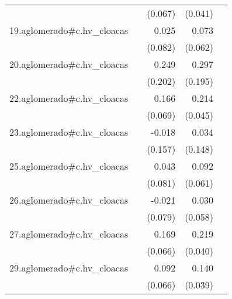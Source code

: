 {\begin{longtable}{l*{4}{D{.}{.}{-1}}}
            &                     &     (0.067)         &     (0.041)         &                     \\
\addlinespace
19.aglomerado#c.hv\_cloacas&                     &       0.025         &       0.073         &                     \\
            &                     &     (0.082)         &     (0.062)         &                     \\
\addlinespace
20.aglomerado#c.hv\_cloacas&                     &       0.249         &       0.297         &                     \\
            &                     &     (0.202)         &     (0.195)         &                     \\
\addlinespace
22.aglomerado#c.hv\_cloacas&                     &       0.166\sym{*}  &       0.214\sym{***}&                     \\
            &                     &     (0.069)         &     (0.045)         &                     \\
\addlinespace
23.aglomerado#c.hv\_cloacas&                     &      -0.018         &       0.034         &                     \\
            &                     &     (0.157)         &     (0.148)         &                     \\
\addlinespace
25.aglomerado#c.hv\_cloacas&                     &       0.043         &       0.092         &                     \\
            &                     &     (0.081)         &     (0.061)         &                     \\
\addlinespace
26.aglomerado#c.hv\_cloacas&                     &      -0.021         &       0.030         &                     \\
            &                     &     (0.079)         &     (0.058)         &                     \\
\addlinespace
27.aglomerado#c.hv\_cloacas&                     &       0.169\sym{*}  &       0.219\sym{***}&                     \\
            &                     &     (0.066)         &     (0.040)         &                     \\
\addlinespace
29.aglomerado#c.hv\_cloacas&                     &       0.092         &       0.140\sym{***}&                     \\
            &                     &     (0.066)         &     (0.039)         &                     \\

\end{longtable}}
